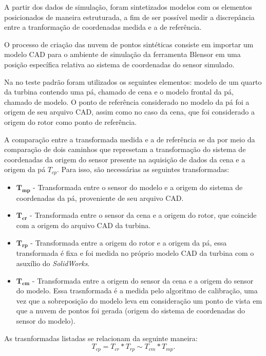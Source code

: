 A partir dos dados de simulação, foram sintetizados modelos com os elementos
posicionados de maneira estruturada, a fim de ser possível medir a discrepância
entre a tranformação de coordenadas medida e a de referência. 

O processo de criação das nuvem de pontos sintéticas consiste em importar um
modelo CAD para o ambiente de simulação da ferramenta Blensor em uma posição
específica relativa ao sistema de coordenadas do sensor simulado. 

Na no teste padrão foram utilizados os seguintes elementos: modelo de um quarto
da turbina contendo uma pá, chamado de cena e o modelo frontal da pá, chamado de
modelo. O ponto de referência considerado no modelo da pá foi a origem de seu
arquivo CAD, assim como no caso da cena, que foi considerado a origem do rotor
como ponto de referência.

A comparação entre a transformada medida e a de referência se da por meio da
comparação de dois caminhos que represetam a transformação do sistema de
coordenadas da origem do sensor presente na aquisição de dados da cena e a
origem da pá $T_{cp}$.  Para isso, são necessárias as seguintes transformadas:

\begin{itemize}
  \item $\mathbf{T_{mp}}$ - Transformada entre o sensor do modelo e a
  origem do sistema de coordenadas da pá, proveniente de seu arquivo CAD.
  \item $\mathbf{T_{cr}}$ - Transformada entre o sensor da cena e a origem do
  rotor, que coincide com a origem do arquivo CAD da turbina.
  \item $\mathbf{T_{rp}}$ - Transformada entre a origem do rotor e a origem da
  pá, essa transformada é fixa e foi medida no próprio modelo CAD da turbina com
  o asuxílio do \textit{SolidWorks}.
  \item $\mathbf{T_{cm}}$ - Transformada entre a origem do sensor da cena e a
  origem do sensor do modelo. Essa trasnformada é a medida pelo algoritmo de
  calibração, uma vez que a sobreposição do modelo leva em consideração um ponto
  de vista em que a nuvem de pontos foi gerada (origem do sistema de
  coordenadas do sensor do modelo).
\end{itemize}

As trasnformadas listadas se relacionam da seguinte maneira:
\begin{equation}
T_{cp} = T_{cr}*T_{rp} \sim T_{cm}*T_{mp}.
\label{eq::tfs}
\end{equation}


